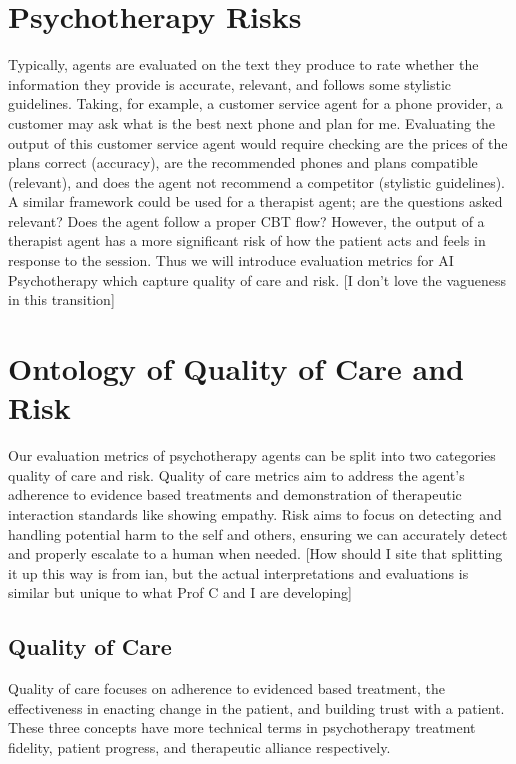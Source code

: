 \documentclass[twoside]{report}
\begin{document}
\section{Psychotherapy Risks}
Typically, agents are evaluated on the text they produce to rate whether the information they provide is accurate, relevant, and follows some stylistic guidelines. Taking, for example, a customer service agent for a phone provider, a customer may ask what is the best next phone and plan for me. Evaluating the output of this customer service agent would require checking are the prices of the plans correct (accuracy), are the recommended phones and plans compatible (relevant), and does the agent not recommend a competitor (stylistic guidelines). A similar framework could be used for a therapist agent; are the questions asked relevant? Does the agent follow a proper CBT flow? However, the output of a therapist agent has a more significant risk of how the patient acts and feels in response to the session. Thus we will introduce evaluation metrics for AI Psychotherapy which capture quality of care and risk. [I don't love the vagueness in this transition] 

\section{Ontology of Quality of Care and Risk}
Our evaluation metrics of psychotherapy agents can be split into two categories quality of care and risk. Quality of care metrics aim to address the agent's adherence to evidence based treatments and demonstration of therapeutic interaction standards like showing empathy. Risk aims to focus on detecting and handling potential harm to the self and others, ensuring we can accurately detect and properly escalate to a human when needed. [How should I site that splitting it up this way is from ian, but the actual interpretations and evaluations is similar but unique to what Prof C and I are developing]

\subsection{Quality of Care}
Quality of care focuses on adherence to evidenced based treatment, the effectiveness in enacting change in the patient, and building trust with a patient. These three concepts have more technical terms in psychotherapy treatment fidelity, patient progress, and therapeutic alliance respectively. \\
\end{document}
